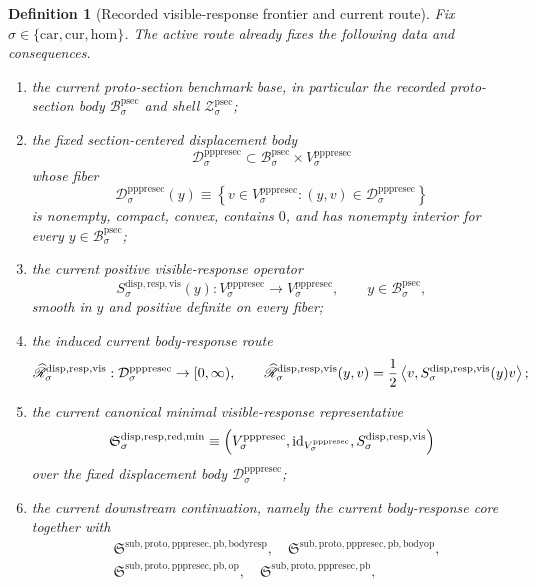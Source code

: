 \documentclass[11pt]{article}
\newcommand{\Car}{\mathrm{car}}
\newcommand{\Cur}{\mathrm{cur}}
\newcommand{\Hom}{\mathrm{hom}}
\newcommand{\ProtoSectionBody}[1]{\mathcal B_{#1}^{\mathrm{psec}}}
\newcommand{\ProtoSectionShell}[1]{\mathcal Z_{#1}^{\mathrm{psec}}}
\newcommand{\PrePreProtoSectionVertical}[1]{V_{#1}^{\mathrm{pppresec}}}
\newcommand{\PrePreProtoSectionResidualBody}[1]{\mathcal D_{#1}^{\mathrm{pppresec}}}
\newcommand{\CoreForcedBodyResponse}[1]{\widehat{\mathscr R}_{#1}^{\mathrm{disp,resp,vis}}}
\newcommand{\VisibleResponseOperator}[1]{S_{#1}^{\mathrm{disp,resp,vis}}}
\newcommand{\MinimalReducedStructure}{\mathfrak S^{\mathrm{disp,resp,red,min}}}
\newcommand{\PullbackBodyResponseCore}{\mathfrak S^{\mathrm{sub,proto,pppresec,pb,bodyresp}}}
\newcommand{\PullbackBodyOperatorCore}{\mathfrak S^{\mathrm{sub,proto,pppresec,pb,bodyop}}}
\newcommand{\PullbackOperatorCore}{\mathfrak S^{\mathrm{sub,proto,pppresec,pb,op}}}
\newcommand{\PrePreProtoSectionPullbackCore}{\mathfrak S^{\mathrm{sub,proto,pppresec,pb}}}
\newtheorem{definition}{Definition}
\begin{document}
\begin{definition}[Recorded visible-response frontier and current route]
\label{def:route}
Fix \(\sigma\in\{\Car,\Cur,\Hom\}\). The active route already fixes the following data and consequences.
\begin{enumerate}
    \item the current proto-section benchmark base, in particular the recorded proto-section body \(\ProtoSectionBody{\sigma}\) and shell \(\ProtoSectionShell{\sigma}\);
    \item the fixed section-centered displacement body
    \[
    \PrePreProtoSectionResidualBody{\sigma}
    \subset
    \ProtoSectionBody{\sigma}\times\PrePreProtoSectionVertical{\sigma}
    \]
    whose fiber
    \[
    \PrePreProtoSectionResidualBody{\sigma}(y)
    \equiv
    \left\{
    v\in\PrePreProtoSectionVertical{\sigma}:(y,v)\in\PrePreProtoSectionResidualBody{\sigma}
    \right\}
    \]
    is nonempty, compact, convex, contains \(0\), and has nonempty interior for every \(y\in\ProtoSectionBody{\sigma}\);
    \item the current positive visible-response operator
    \[
    \VisibleResponseOperator{\sigma}(y):
    \PrePreProtoSectionVertical{\sigma}\to\PrePreProtoSectionVertical{\sigma},
    \qquad
    y\in\ProtoSectionBody{\sigma},
    \]
    smooth in \(y\) and positive definite on every fiber;
    \item the induced current body-response route
    \[
    \CoreForcedBodyResponse{\sigma}:
    \PrePreProtoSectionResidualBody{\sigma}\to[0,\infty),
    \qquad
    \CoreForcedBodyResponse{\sigma}(y,v)
    =
    \frac{1}{2}
    \ev{v,\VisibleResponseOperator{\sigma}(y)v};
    \]
    \item the current canonical minimal visible-response representative
    \[
    \MinimalReducedStructure_{\sigma}
    \equiv
    \Bigl(
    \PrePreProtoSectionVertical{\sigma},
    \mathrm{id}_{\PrePreProtoSectionVertical{\sigma}},
    \VisibleResponseOperator{\sigma}
    \Bigr)
    \]
    over the fixed displacement body \(\PrePreProtoSectionResidualBody{\sigma}\);
    \item the current downstream continuation, namely the current body-response core together with
    \[
    \begin{aligned}
    &\PullbackBodyResponseCore,\quad
    \PullbackBodyOperatorCore,\\
    &\PullbackOperatorCore,\quad
    \PrePreProtoSectionPullbackCore,
    \end{aligned}
    \]
    \[
    \begin{aligned}

\end{aligned}\]
\end{enumerate}
\end{definition}
\end{document}
